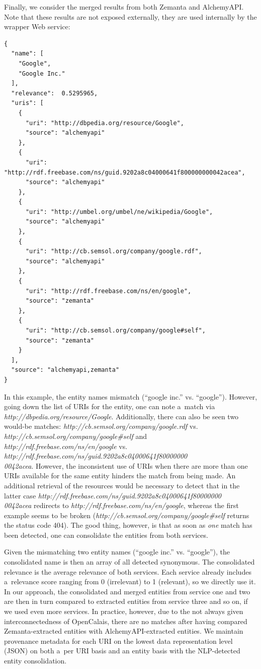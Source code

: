 Finally, we consider the merged results from both Zemanta and AlchemyAPI. Note that these results are not exposed externally, they are used internally by the wrapper Web service:

\begin{lstlisting}
{
  "name": [
    "Google",
    "Google Inc."
  ],
  "relevance":  0.5295965,
  "uris": [
    {
      "uri": "http://dbpedia.org/resource/Google",
      "source": "alchemyapi"
    },
    {
      "uri": "http://rdf.freebase.com/ns/guid.9202a8c04000641f800000000042acea",
      "source": "alchemyapi"
    },
    {
      "uri": "http://umbel.org/umbel/ne/wikipedia/Google",
      "source": "alchemyapi"
    },
    {
      "uri": "http://cb.semsol.org/company/google.rdf",
      "source": "alchemyapi"
    },
    {
      "uri": "http://rdf.freebase.com/ns/en/google",
      "source": "zemanta"
    },
    {
      "uri": "http://cb.semsol.org/company/google#self",
      "source": "zemanta"
    }
  ],
  "source": "alchemyapi,zemanta"
}
\end{lstlisting}

In this example, the entity names mismatch (``google inc.'' vs. ``google''). However, going down the list of URIs for
the entity, one can note a~match via \textit{http://dbpedia.org/resource/Google}. Additionally, there can also
be seen two would-be matches: \textit{http://cb.semsol.org/company/google.rdf}
vs. \textit{http://cb.semsol.org/company/google\#self} and
\textit{http://rdf.freebase.com/ns/en/google} vs.
\textit{http://rdf.freebase.com/ns/guid.9202a8c04000641f80000000\\0042acea}. However, the inconsistent use of
URIs when there are more than one URIs available for the same entity hinders the match from being made. An additional
retrieval of the resources would be necessary to detect that in the latter case
\textit{http://rdf.freebase.com/ns/guid.9202a8c04000641f80000000\\0042acea} redirects to
\textit{http://rdf.freebase.com/ns/en/google}, whereas the first example seems to be broken
(\textit{http://cb.semsol.org/company/google\#self} returns the status code 404). The good thing, however, is
that as soon as \emph{one} match has been detected, one can consolidate the entities from both services.

Given the mismatching two entity names (``google inc.'' vs. ``google''), the consolidated name is then an array of all
detected synonymous. The consolidated relevance is the average relevance of both services. Each service already includes a~relevance score ranging from
0 (irrelevant) to 1 (relevant), so we directly use it. In our approach, the consolidated and merged entities from
service one and two are then in turn compared to extracted entities from service three and so on, if we used even more
services. In practice, however, due to the not always given interconnectedness of OpenCalais, there are no matches
after having compared Zemanta-extracted entities with AlchemyAPI-extracted entities. We maintain provenance metadata for each URI on the lowest data representation level (JSON)
on both a~per URI basis and an entity basis with the NLP-detected entity consolidation.

